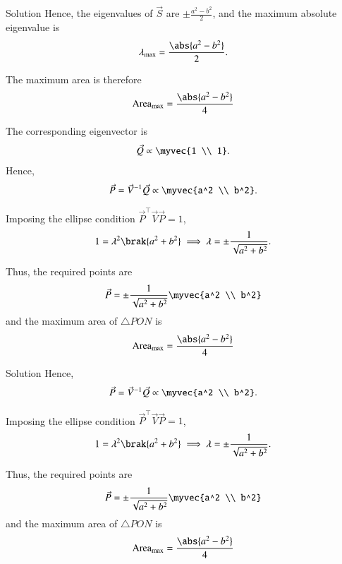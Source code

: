 \documentclass{beamer}
\begin{document}
\begin{frame}{Solution}
Hence, the eigenvalues of $\vec{S}$ are $\pm \frac{a^2 - b^2}{2}$, and the maximum absolute eigenvalue is
\begin{align}
    \lambda_{\max} = \frac{\abs{a^2 - b^2}}{2}.
\end{align}

The maximum area is therefore
\begin{align}
    \text{Area}_{\max} = \frac{\abs{a^2 - b^2}}{4}
\end{align}

The corresponding eigenvector is
\begin{align}
    \vec{Q} \propto \myvec{1 \\ 1}.
\end{align}Hence,
\begin{align}
    \vec{P} = \vec{V}^{-1}\vec{Q} \propto \myvec{a^2 \\ b^2}.
\end{align}

Imposing the ellipse condition $\vec{P}^\top \vec{V} \vec{P} = 1$,
\begin{align}
    1 = \lambda^2 \brak{a^2 + b^2}
    \implies \lambda = \pm \frac{1}{\sqrt{a^2 + b^2}}.
\end{align}

Thus, the required points are
\begin{align}
    \vec{P} = \pm \frac{1}{\sqrt{a^2 + b^2}}\myvec{a^2 \\ b^2}
\end{align}
and the maximum area of $\triangle PON$ is
\begin{align}
    \text{Area}_{\max} = \frac{\abs{a^2 - b^2}}{4}
\end{align}
\end{frame}


\begin{frame}{Solution}
Hence,
\begin{align}
    \vec{P} = \vec{V}^{-1}\vec{Q} \propto \myvec{a^2 \\ b^2}.
\end{align}

Imposing the ellipse condition $\vec{P}^\top \vec{V} \vec{P} = 1$,
\begin{align}
    1 = \lambda^2 \brak{a^2 + b^2}
    \implies \lambda = \pm \frac{1}{\sqrt{a^2 + b^2}}.
\end{align}

Thus, the required points are
\begin{align}
    \vec{P} = \pm \frac{1}{\sqrt{a^2 + b^2}}\myvec{a^2 \\ b^2}
\end{align}
and the maximum area of $\triangle PON$ is
\begin{align}
    \text{Area}_{\max} = \frac{\abs{a^2 - b^2}}{4}
\end{align}
\end{frame}
\end{document}
